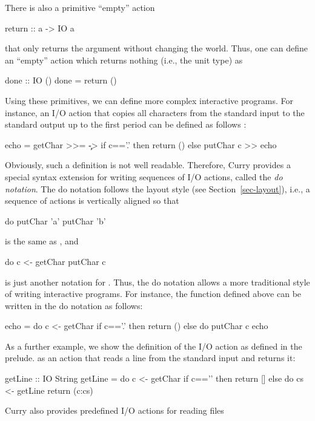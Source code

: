 There is also a primitive ``empty'' action
\begin{curry}
return :: a -> IO a
\end{curry}
that only returns the argument without changing the world.
Thus, one can define an ``empty'' action
which returns nothing (i.e., the unit type) as
\begin{curry}
done :: IO ()
done = return ()
\end{curry}
%
Using these primitives, we can define more complex interactive programs.
For instance, an I/O action that copies all characters from
the standard input to the standard output up to the first period
can be defined as follows
:
\begin{curry}
echo = getChar >>= \c -> if c=='.' then return ()
                                   else putChar c >> echo
\end{curry}
%
Obviously, such a definition is not well readable.
Therefore, Curry provides a special syntax extension for
writing sequences of I/O actions, called the
\emph{do notation}.
The do notation follows the layout style
(see Section~\ref{sec-layout}), i.e., a sequence of actions
is vertically aligned so that
\begin{curry}
do putChar 'a'
   putChar 'b'
\end{curry}
is the same as , and
\begin{curry}
do c <- getChar
   putChar c
\end{curry}
is just another notation for .
Thus, the do notation allows a more traditional style of writing
interactive programs. For instance, the function 
defined above can be written in the do notation as follows:
\begin{curry}
echo = do c <- getChar
          if c=='.'
            then return ()
            else do putChar c
                    echo
\end{curry}
As a further example, we show the definition of the I/O action
 as defined in the prelude.
 as an action that reads a line from the standard input
and returns it:
\begin{curry}
getLine :: IO String
getLine = do c <- getChar
             if c=='\n'
                then return []
                else do cs <- getLine
                        return (c:cs)
\end{curry}
Curry also provides predefined I/O actions for reading files
